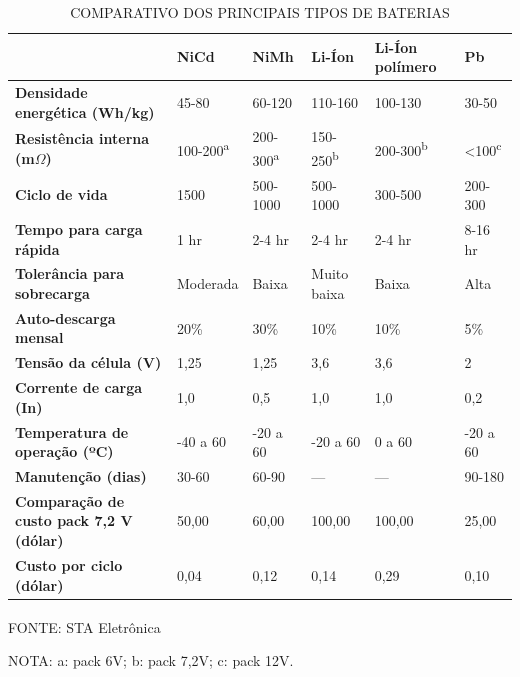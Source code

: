 \documentclass[
	12pt,				%
	openright,			%
	oneside,			%
	a4paper,			%
	english,			%
	french,				%
	spanish,			%
	brazil,				%
	oldfontcommands
	]{abntex2}
\begin{document}
	\begin{table}[th]
		\caption{COMPARATIVO DOS PRINCIPAIS TIPOS DE BATERIAS}
		\label{Tab_Bateria}
		\begin{tabular}{p{3.5cm}|p{1.6cm}|p{1.6cm}|p{1.6cm}|p{2cm}|p{1.6cm}}
	 	& \textbf{NiCd} & \textbf{NiMh} & \textbf{Li-Íon} & \textbf{Li-Íon polímero} & \textbf{Pb} \\
	 	\hline
		\textbf{Densidade energética (Wh/kg)} & 45-80 & 60-120 & 110-160 & 100-130 & 30-50 \\
	 	\hline
	 	\textbf{Resistência interna (m$\Omega$)} & 100-200\textsuperscript{a} & 200-300\textsuperscript{a} & 150-250\textsuperscript{b} & 200-300\textsuperscript{b} & <100\textsuperscript{c} \\
	 	\hline
	 	\textbf{Ciclo de vida} & 1500 & 500-1000 & 500-1000 & 300-500 & 200-300 \\
		\hline
		\textbf{Tempo para carga rápida} & 1 hr & 2-4 hr & 2-4 hr & 2-4 hr & 8-16 hr \\
		\hline
		\textbf{Tolerância para sobrecarga} & Moderada & Baixa & Muito baixa & Baixa & Alta \\
		\hline
		\textbf{Auto-descarga mensal} & 20\% & 30\% & 10\% & 10\% & 5\% \\
		\hline
		\textbf{Tensão da célula (V)} & 1,25 & 1,25 & 3,6 & 3,6 & 2 \\
		\hline
		\textbf{Corrente de carga (In)} & 1,0 & 0,5 & 1,0 & 1,0 & 0,2 \\
		\hline
		\textbf{Temperatura de operação (ºC)} & -40 a 60 & -20 a 60 & -20 a 60 & 0 a 60 & -20 a 60 \\
		\hline
		\textbf{Manutenção (dias)} & 30-60 & 60-90 & --- & --- & 90-180 \\
		\hline
		\textbf{Comparação de custo pack 7,2 V (dólar)} & 50,00 & 60,00 & 100,00 & 100,00 & 25,00 \\
		\hline
		\textbf{Custo por ciclo (dólar)} & 0,04 & 0,12 & 0,14 & 0,29 & 0,10 \\
		\hline 
		\end{tabular}
	\centering
	\begin{small}
	\vspace{3pt}
		FONTE: STA Eletrônica\textsuperscript{\cite{sta}}
	\end{small}
	
	\begin{footnotesize}
		NOTA: a: pack 6V; b: pack 7,2V; c: pack 12V.
	\end{footnotesize}

\end{table}
	
\end{document}

